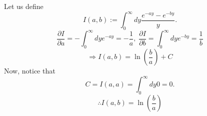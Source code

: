 \item

Let us define
\[
	I(a, b) := \int_0^\infty dy \frac{e^{-ay} - e^{-by}}{y}.
\]
\[
	\frac{\partial I}{\partial a}
	= -\int_0^\infty dy e^{-ay}
	= -\frac{1}{a},\;
	\frac{\partial I}{\partial b}
	= \int_0^\infty dy e^{-by}
	= \frac{1}{b}
\]
\[
	\Rightarrow I(a, b) = \ln \left( \frac{b}{a} \right) + C
\]
Now, notice that
\[
	C
	= I(a, a)
	= \int_0^\infty dy 0
	= 0.
\]
\[
	\therefore I(a, b) = \ln \left( \frac{b}{a} \right)
\]